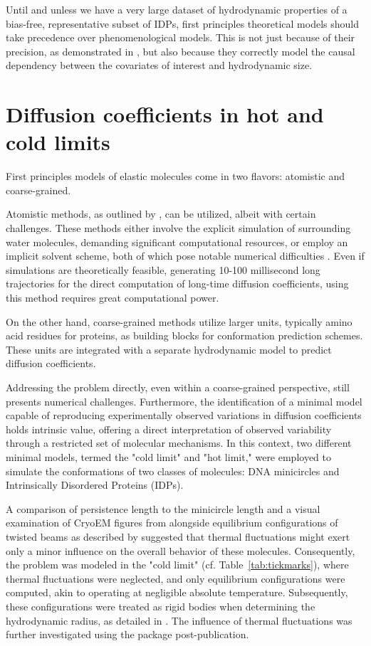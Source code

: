 \documentclass{doctoral}
\newcommand{\code}[1]{\texttt{\detokenize{#1}}}
\begin{document}
Until and unless we have a very large dataset of hydrodynamic properties of a bias-free, representative subset of IDPs, first principles theoretical models should take precedence over phenomenological models.
This is not just because of their precision, as demonstrated in \textcite{Waszkiewicz_2024_mda}, but also because they correctly model the causal dependency between the covariates of interest and hydrodynamic size.

\section{Diffusion coefficients in hot and cold limits}

First principles models of elastic molecules come in two flavors: atomistic and coarse-grained.

Atomistic methods, as outlined by \textcite{Karplus_1990}, can be utilized, albeit with certain challenges.
These methods either involve the explicit simulation of surrounding water molecules, demanding significant computational resources, or employ an implicit solvent scheme, both of which pose notable numerical difficulties \cite{Frenkel_2001}.
Even if simulations are theoretically feasible, generating 10-100 millisecond long trajectories for the direct computation of long-time diffusion coefficients, using this method requires great computational power.

On the other hand, coarse-grained methods utilize larger units, typically amino acid residues for proteins, as building blocks for conformation prediction schemes.
These units are integrated with a separate hydrodynamic model to predict diffusion coefficients.

Addressing the problem directly, even within a coarse-grained perspective, still presents numerical challenges.
Furthermore, the identification of a minimal model capable of reproducing experimentally observed variations in diffusion coefficients holds intrinsic value, offering a direct interpretation of observed variability through a restricted set of molecular mechanisms.
In this context, two different minimal models, termed the "cold limit" and "hot limit," were employed to simulate the conformations of two classes of molecules: DNA minicircles and Intrinsically Disordered Proteins (IDPs).

A comparison of persistence length to the minicircle length and a visual examination of CryoEM figures from \textcite{Irobalieva_2015} alongside equilibrium configurations of twisted beams as described by \textcite{Coleman_2000} suggested that thermal fluctuations might exert only a minor influence on the overall behavior of these molecules.
Consequently, the problem was modeled in the "cold limit" (cf.
Table~\ref{tab:tickmarks}), where thermal fluctuations were neglected, and only equilibrium configurations were computed, akin to operating at negligible absolute temperature.
Subsequently, these configurations were treated as rigid bodies when determining the hydrodynamic radius, as detailed in \textcite{Waszkiewicz_2023_dna}.
The influence of thermal fluctuations was further investigated using the \code{pychastic} package post-publication.
\end{document}
